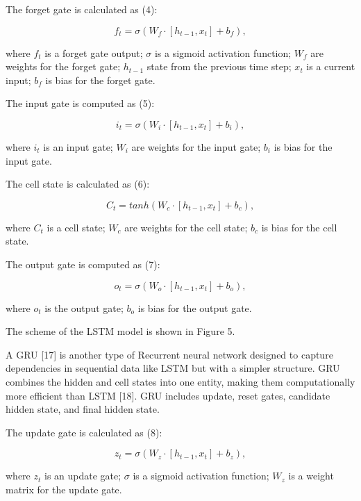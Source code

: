 \begin{multicols}{2}
The forget gate is calculated as (4):

\begin{equation}
f_t=\sigma(W_f\cdot[h_{t-1},x_t]+b_f),
\end{equation}

where $f_t$ is a forget gate output;
$\sigma$ is a sigmoid activation function;
$W_f$ are weights for the forget gate;
$h_{t-1}$ state from the previous time step;
$x_t$ is a current input; $b_f$ is bias
for the forget gate.

The input gate is computed as (5):

\begin{equation}
i_t=\sigma(W_i\cdot[h_{t-1},x_t]+b_i),
\end{equation}

where $i_t$ is an input gate;
$W_i$ are weights for the input gate;
$b_i$ is bias for the input gate.

The cell state is calculated as (6):

\begin{equation}
C_t=tanh(W_c\cdot[h_{t-1},x_t]+b_c),
\end{equation}

where $C_t$ is a cell state;
$W_c$ are weights for the cell state;
$b_c$ is bias for the cell state.

The output gate is computed as (7):

\begin{equation}
o_t=\sigma(W_o\cdot[h_{t-1},x_t]+b_o),
\end{equation}

where $o_t$ is the output gate;
$b_o$ is bias for the output gate.

The scheme of the LSTM model is shown in Figure 5.

A GRU {[}17{]} is another type of Recurrent neural network designed to
capture dependencies in sequential data like LSTM but with a simpler
structure. GRU combines the hidden and cell states into one entity,
making them computationally more efficient than LSTM {[}18{]}. GRU
includes update, reset gates, candidate hidden state, and final hidden
state.

The update gate is calculated as (8):

\begin{equation}
z_t=\sigma(W_z\cdot[h_{t-1},x_t]+b_z),
\end{equation}

where $z_t$ is an update gate;
$\sigma$ is a sigmoid activation function;
$W_z$ is a weight matrix for the update gate.


\end{multicols}
